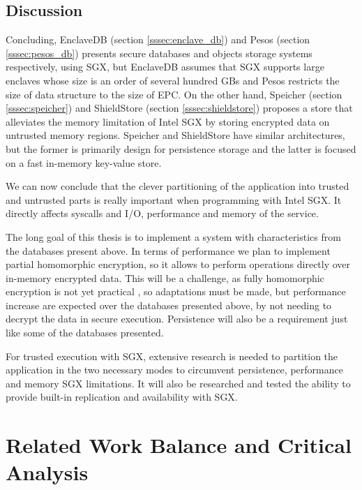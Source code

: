 \subsection{Discussion}
\label{ssec:s3_discussion}

Concluding, EnclaveDB (section \ref{sssec:enclave_db}) and Pesos (section \ref{sssec:pesos_db}) presents secure databases and objects storage systems respectively, using \gls{SGX}, but EnclaveDB assumes that \gls{SGX} supports large enclaves whose size is an order of several hundred \gls{GB}s and Pesos restricts the size of data structure to the size of \gls{EPC}. On the other hand, Speicher (section \ref{sssec:speicher}) and ShieldStore (section \ref{sssec:shieldstore}) proposes a store that alleviates the memory limitation of Intel \gls{SGX} by storing encrypted data on untrusted memory regions. Speicher and ShieldStore have similar architectures, but the former is primarily design for persistence storage and the latter is focused on a fast in-memory key-value store.

We can now conclude that the clever partitioning of the application into trusted and untrusted parts is really important when programming with Intel \gls{SGX}. It directly affects \gls{syscall}s and \gls{I/O}, performance and memory of the service. 

The long goal of this thesis is to implement a system with characteristics from the databases present above. In terms of performance we plan to implement partial homomorphic encryption, so it allows to perform operations directly over in-memory encrypted data. This will be a challenge, as fully homomorphic encryption is not yet practical \cite{homomorphic:1}, so adaptations must be made, but performance increase are expected  over the databases presented above, by not needing to decrypt the data in secure execution. Persistence will also be a requirement just like some of the databases presented.

For trusted execution with \gls{SGX}, extensive research is needed to partition the application in the two necessary modes to circumvent persistence, performance and memory \gls{SGX} limitations. It will also be researched and tested the ability to provide built-in replication and availability with \gls{SGX}.

\section{Related Work Balance and Critical Analysis}
\label{sec:related_work_balance_and_critical_analysis}

